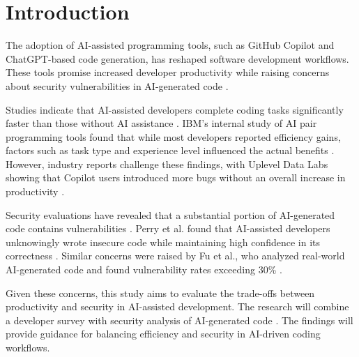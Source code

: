 \section{Introduction}
The adoption of AI-assisted programming tools, such as GitHub Copilot and ChatGPT-based code generation, has reshaped software development workflows. These tools promise increased developer productivity \cite{microsoft2023, ibm2025} while raising concerns about security vulnerabilities in AI-generated code \cite{fu2023, perry2023}.

Studies indicate that AI-assisted developers complete coding tasks significantly faster than those without AI assistance \cite{microsoft2023}. IBM’s internal study of AI pair programming tools found that while most developers reported efficiency gains, factors such as task type and experience level influenced the actual benefits \cite{ibm2025}. However, industry reports challenge these findings, with Uplevel Data Labs showing that Copilot users introduced more bugs without an overall increase in productivity \cite{uplevel2024}.

Security evaluations have revealed that a substantial portion of AI-generated code contains vulnerabilities \cite{fu2023, perry2023}. Perry et al. found that AI-assisted developers unknowingly wrote insecure code while maintaining high confidence in its correctness \cite{perry2023}. Similar concerns were raised by Fu et al., who analyzed real-world AI-generated code and found vulnerability rates exceeding 30\% \cite{fu2023}.

Given these concerns, this study aims to evaluate the trade-offs between productivity and security in AI-assisted development. The research will combine a developer survey \cite{developer-adoption, snyk2023} with security analysis of AI-generated code \cite{fu2023, asare2024}. The findings will provide guidance for balancing efficiency and security in AI-driven coding workflows.

